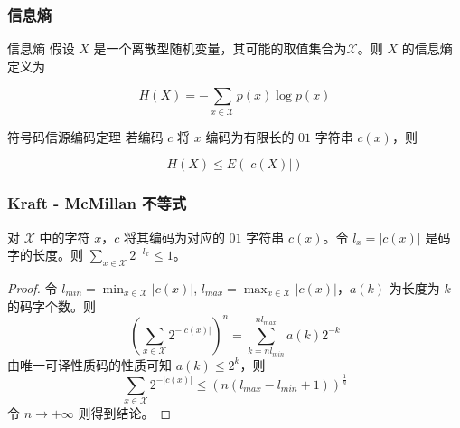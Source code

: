 \documentclass{beamer}
\begin{document}
\begin{frame}
    \frametitle{信息熵}

    \begin{block}{信息熵}
        假设 $X$ 是一个离散型随机变量，其可能的取值集合为$\mathcal{X}$。则 $X$ 的信息熵定义为

        \[H(X) = -\sum_{x\in \mathcal{X}}p(x)\log p(x)\]
    \end{block}

    \begin{block}{符号码信源编码定理}
        若编码 $c$ 将 $x$ 编码为有限长的 $01$ 字符串 $c(x)$，则

        \[H(X) \leq E(\lvert c(X)\rvert)\]
    \end{block}




\end{frame}

\begin{frame}
    \frametitle{Kraft - McMillan 不等式}

    对 $\mathcal{X}$ 中的字符 $x$，$c$ 将其编码为对应的 $01$ 字符串 $c(x)$。令 $l_x = \lvert c(x)\rvert$ 是码字的长度。则 $\sum_{x\in\mathcal{X}}2^{-l_x}\leq 1$。

    \begin{proof}
        令 $l_{min} = \min_{x\in\mathcal{X}}\lvert c(x)\rvert$, $l_{max} = \max_{x\in\mathcal{X}}\lvert c(x)\rvert$，$a(k)$ 为长度为 $k$ 的码字个数。则
        \[\left(\sum_{x\in\mathcal{X}}2^{-\lvert c(x)\rvert}\right)^n = \sum_{k = nl_{min}}^{nl_{max}} a(k)2^{-k}\]
        由唯一可译性质码的性质可知 $a(k)\leq 2^k$，则
        \[\sum_{x\in\mathcal{X}}2^{-\lvert c(x)\rvert} \leq (n(l_{max} - l_{min} + 1))^{\frac{1}{n}}\]
        令 $n\to +\infty$ 则得到结论。
    \end{proof}

\end{frame}
\end{document}
